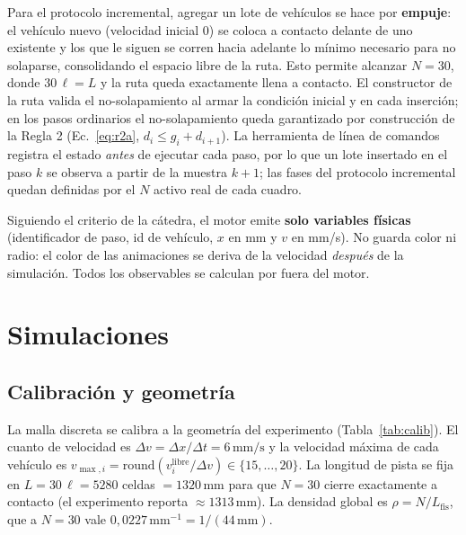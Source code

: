 \documentclass[11pt,a4paper]{article}
\newcommand{\unit}[1]{\,\mathrm{#1}}
\begin{document}
Para el protocolo incremental, agregar un lote de vehículos se hace por
\textbf{empuje}: el vehículo nuevo (velocidad inicial $0$) se coloca a contacto delante
de uno existente y los que le siguen se corren hacia adelante lo mínimo necesario para
no solaparse, consolidando el espacio libre de la ruta. Esto permite alcanzar $N=30$,
donde $30\,\ell = L$ y la ruta queda exactamente llena a contacto. El constructor de la
ruta valida el no-solapamiento al armar la condición inicial y en cada inserción; en los
pasos ordinarios el no-solapamiento queda garantizado por construcción de la Regla 2
(Ec.~\eqref{eq:r2a}, $d_i \le g_i + d_{i+1}$). La herramienta de línea de comandos registra el estado
\emph{antes} de ejecutar cada paso, por lo que un lote insertado en el paso $k$ se observa
a partir de la muestra $k+1$; las fases del protocolo incremental quedan definidas por el
$N$ activo real de cada cuadro.

Siguiendo el criterio de la cátedra, el motor emite \textbf{solo variables físicas}
(identificador de paso, id de vehículo, $x$ en mm y $v$ en mm/s). No guarda color ni
radio: el color de las animaciones se deriva de la velocidad \emph{después} de la
simulación. Todos los observables se calculan por fuera del motor.

\section{Simulaciones}\label{sec:simulaciones}

\subsection{Calibración y geometría}

La malla discreta se calibra a la geometría del experimento
(Tabla~\ref{tab:calib}). El cuanto de velocidad es $\Delta v=\Delta x/\Delta t=6\unit{mm/s}$
y la velocidad máxima de cada vehículo es $v_{\max,i}=\mathrm{round}(v^{\mathrm{libre}}_i/\Delta v)\in\{15,\dots,20\}$.
La longitud de pista se fija en $L=30\,\ell=5280$ celdas $=1320\unit{mm}$ para que
$N=30$ cierre exactamente a contacto (el experimento reporta $\approx1313\unit{mm}$). La densidad global es
$\rho=N/L_{\mathrm{fis}}$, que a $N=30$ vale $0{,}0227\unit{mm^{-1}}=1/(44\unit{mm})$.
\end{document}
